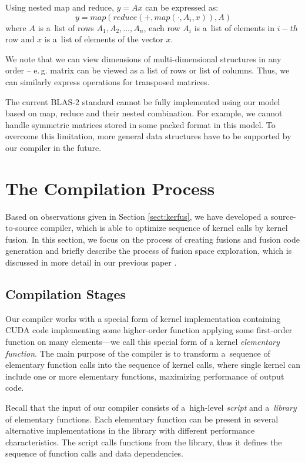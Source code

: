 \documentclass[final]{siamltex}
\def\eg{e.\,g.}
\begin{document}
{Using nested map and reduce, $y = Ax$ can be expressed as:
\begin{equation}
\label{eq:sgemv}
y = map(reduce(+, map(\cdot, A_i, x)), A)
\end{equation}
where $A$ is a~list of rows $A_1, A_2, \dotsc, A_n$, each row $A_i$ is a~list of elements in $i-th$ row and $x$ is a~list of elements of the vector $x$.

We note that we can view dimensions of multi-dimensional structures in any order -- \eg{} matrix can be viewed as a list of rows or list of columns. Thus, we can similarly express operations for transposed matrices.

The current BLAS-2 standard cannot be fully implemented using our model based on map, reduce and their nested combination. For example, we cannot handle symmetric matrices stored in some packed format in this model. To overcome this limitation, more general data structures have to be supported by our compiler in the future.


\section{The Compilation Process}
\label{sect:compilation}

Based on observations given in Section \ref{sect:kerfus}, we have developed a source-to-source compiler, which is able to optimize sequence of kernel calls by kernel fusion. In this section, we focus on the process of creating fusions and fusion code generation and briefly describe the process of fusion space exploration, which is discussed in more detail in our previous paper \cite{fousek2011automatic}.

\subsection{Compilation Stages}

Our compiler works with a special form of kernel implementation containing CUDA code implementing some higher-order function applying some first-order function on many elements---we call this special form of a kernel \textit{elementary function}. The main purpose of the compiler is to transform a~sequence of elementary function calls into the sequence of kernel calls, where single kernel can include one or more elementary functions, maximizing performance of output code. 

Recall that the input of our compiler consists of a~high-level \textit{script} and a~\textit{library} of elementary functions. Each elementary function can be present in several alternative implementations in the library with different performance characteristics. The script calls functions from the library, thus it defines the sequence of function calls and data dependencies.

}
\end{document}
